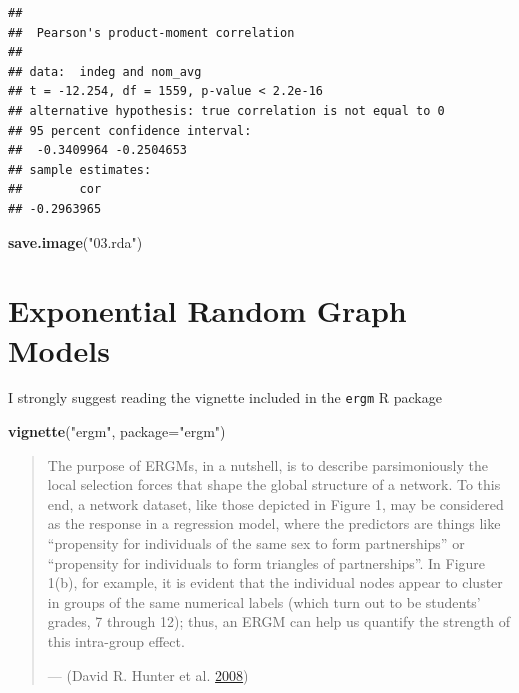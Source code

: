 \documentclass[]{book}
\newenvironment{Shaded}{\begin{snugshade}}{\end{snugshade}}
\newcommand{\DataTypeTok}[1]{\textcolor[rgb]{0.13,0.29,0.53}{#1}}
\newcommand{\KeywordTok}[1]{\textcolor[rgb]{0.13,0.29,0.53}{\textbf{#1}}}
\newcommand{\NormalTok}[1]{#1}
\newcommand{\StringTok}[1]{\textcolor[rgb]{0.31,0.60,0.02}{#1}}
\begin{document}
\begin{verbatim}
## 
##  Pearson's product-moment correlation
## 
## data:  indeg and nom_avg
## t = -12.254, df = 1559, p-value < 2.2e-16
## alternative hypothesis: true correlation is not equal to 0
## 95 percent confidence interval:
##  -0.3409964 -0.2504653
## sample estimates:
##        cor 
## -0.2963965
\end{verbatim}

\begin{Shaded}
\begin{Highlighting}[]
\KeywordTok{save.image}\NormalTok{(}\StringTok{"03.rda"}\NormalTok{)}
\end{Highlighting}
\end{Shaded}

\hypertarget{exponential-random-graph-models}{%
\chapter{Exponential Random Graph Models}\label{exponential-random-graph-models}}

I strongly suggest reading the vignette included in the \texttt{ergm} R package

\begin{Shaded}
\begin{Highlighting}[]
\KeywordTok{vignette}\NormalTok{(}\StringTok{"ergm"}\NormalTok{, }\DataTypeTok{package=}\StringTok{"ergm"}\NormalTok{)}
\end{Highlighting}
\end{Shaded}

\begin{quote}
The purpose of ERGMs, in a nutshell, is to describe parsimoniously the local selection forces
that shape the global structure of a network. To this end, a network dataset, like those
depicted in Figure 1, may be considered as the response in a regression model, where the
predictors are things like ``propensity for individuals of the same sex to form partnerships'' or
``propensity for individuals to form triangles of partnerships''. In Figure 1(b), for example, it
is evident that the individual nodes appear to cluster in groups of the same numerical labels
(which turn out to be students' grades, 7 through 12); thus, an ERGM can help us quantify
the strength of this intra-group effect.

--- (David R. Hunter et al. \protect\hyperlink{ref-Hunter2008}{2008})
\end{quote}
\end{document}
